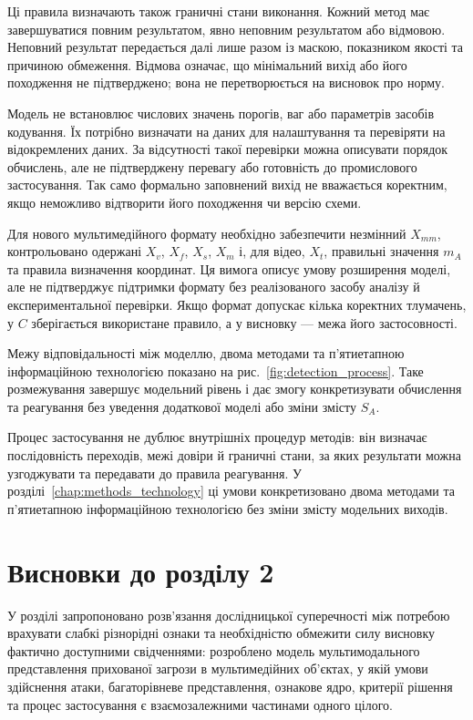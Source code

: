 Ці правила визначають також граничні стани виконання. Кожний метод має завершуватися повним результатом, явно неповним результатом або відмовою. Неповний результат передається далі лише разом із маскою, показником якості та причиною обмеження. Відмова означає, що мінімальний вихід або його походження не підтверджено; вона не перетворюється на висновок про норму.

Модель не встановлює числових значень порогів, ваг або параметрів засобів кодування. Їх потрібно визначати на даних для налаштування та перевіряти на відокремлених даних. За відсутності такої перевірки можна описувати порядок обчислень, але не підтверджену перевагу або готовність до промислового застосування. Так само формально заповнений вихід не вважається коректним, якщо неможливо відтворити його походження чи версію схеми.

Для нового мультимедійного формату необхідно забезпечити незмінний $X_{mm}$, контрольовано одержані $X_v$, $X_f$, $X_s$, $X_m$ і, для відео, $X_t$, правильні значення $m_A$ та правила визначення координат. Ця вимога описує умову розширення моделі, але не підтверджує підтримки формату без реалізованого засобу аналізу й експериментальної перевірки. Якщо формат допускає кілька коректних тлумачень, у $C$ зберігається використане правило, а у висновку --- межа його застосовності.

Межу відповідальності між моделлю, двома методами та п’ятиетапною інформаційною технологією показано на рис.~\ref{fig:detection_process}. Таке розмежування завершує модельний рівень і дає змогу конкретизувати обчислення та реагування без уведення додаткової моделі або зміни змісту $S_A$.



Процес застосування не дублює внутрішніх процедур методів: він визначає послідовність переходів, межі довіри й граничні стани, за яких результати можна узгоджувати та передавати до правила реагування. У розділі~\ref{chap:methods_technology} ці умови конкретизовано двома методами та п’ятиетапною інформаційною технологією без зміни змісту модельних виходів.

\section*{Висновки до розділу 2}

У розділі запропоновано розв’язання дослідницької суперечності між потребою врахувати слабкі різнорідні ознаки та необхідністю обмежити силу висновку фактично доступними свідченнями: розроблено модель мультимодального представлення прихованої загрози в мультимедійних об’єктах, у якій умови здійснення атаки, багаторівневе представлення, ознакове ядро, критерії рішення та процес застосування є взаємозалежними частинами одного цілого.

